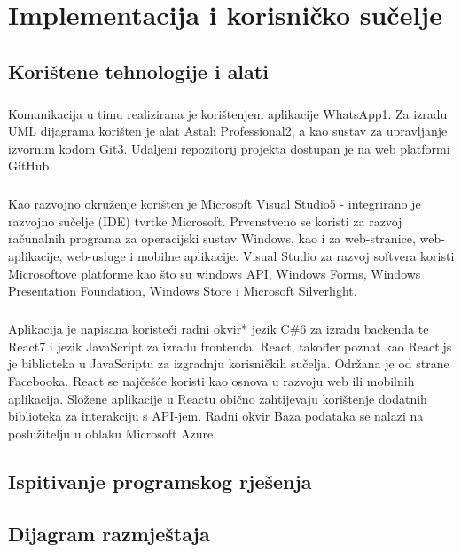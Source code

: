 \chapter{Implementacija i korisničko sučelje}

\section{Korištene tehnologije i alati}

\paragraph{}
{Komunikacija u timu realizirana je korištenjem aplikacije WhatsApp1. Za izradu UML dijagrama korišten je alat Astah Professional2, a kao sustav za upravljanje izvornim kodom Git3. Udaljeni repozitorij projekta dostupan je na web platformi GitHub.
}
\paragraph{}{
Kao razvojno okruženje korišten je Microsoft Visual Studio5 - integrirano je razvojno sučelje (IDE) tvrtke Microsoft. Prvenstveno se koristi za razvoj računalnih programa za operacijski sustav Windows, kao i za web-stranice, web-aplikacije, web-usluge i mobilne aplikacije. Visual Studio za razvoj softvera koristi Microsoftove platforme kao što su windows API, Windows Forms, Windows Presentation Foundation, Windows Store i Microsoft Silverlight.
}
\paragraph{}{
Aplikacija je napisana koristeći radni okvir* jezik C\#6 za izradu backenda te React7 i jezik JavaScript za izradu frontenda. React, također poznat kao React.js je biblioteka u JavaScriptu za izgradnju korisničkih sučelja. Održana je od strane Facebooka. React se najčešće koristi kao osnova u razvoju web ili mobilnih aplikacija. Složene aplikacije u Reactu obično zahtijevaju korištenje dodatnih biblioteka za interakciju s API-jem. Radni okvir Baza podataka se nalazi na poslužitelju u oblaku Microsoft Azure.
}



\section{Ispitivanje programskog rješenja}

\section{Dijagram razmještaja}

